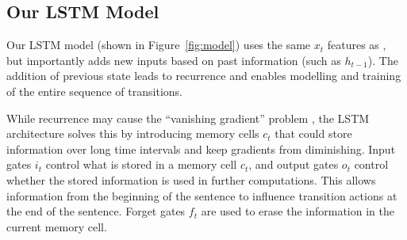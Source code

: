 \subsection{Our LSTM Model}
Our LSTM model (shown in Figure~\ref{fig:model}) uses the same $x_t$ features as , but importantly adds new inputs based on past information (such as $h_{t-1}$). The addition of previous state leads to recurrence and enables modelling and training of the entire sequence of transitions. 

While recurrence may cause the ``vanishing gradient'' problem \cite{Bet94},
the LSTM architecture solves this by introducing memory cells $c_t$ that could store information over long time intervals and keep gradients from diminishing. Input gates $i_t$ control what is stored in a memory cell $c_t$, and output gates $o_t$ control whether the stored information is used in further computations. This allows information from the beginning of the sentence to influence transition actions at the end of the sentence. Forget gates $f_t$ are used to erase the information in the current memory cell. 

